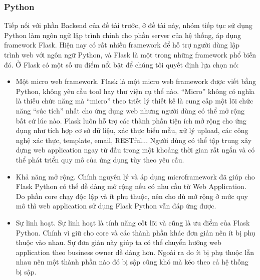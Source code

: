 \subsubsection{Python}
Tiếp nối với phần Backend của đề tài trước, ở đề tài này, nhóm tiếp tục sử dụng Python làm ngôn ngữ lập trình chính cho phần server của hệ thống, áp dụng framework Flask. Hiện nay có rất nhiều framework để hỗ trợ người dùng lập trình web với ngôn ngữ Python, và Flask là một trong những framework phổ biến đó. 
\newline
Ở Flask có một số ưu điểm nổi bật để chúng tôi quyết định lựa chọn nó:
\begin{itemize}
    \item Một micro web framework. Flask là một micro web framework được viết bằng Python, không yêu cầu tool hay thư viện cụ thể nào. “Micro” không có nghĩa là thiếu chức năng mà “micro” theo triết lý thiết kế là cung cấp một lõi chức năng “súc tích” nhất cho ứng dụng web nhưng người dùng có thể mở rộng bất cứ lúc nào. Flask luôn hỗ trợ các thành phần tiện ích mở rộng cho ứng dụng như tích hợp cơ sở dữ liệu, xác thực biểu mẫu, xử lý upload, các công nghệ xác thực, template, email, RESTful... Người dùng có thể tập trung xây dựng web application ngay từ đầu trong một khoảng thời gian rất ngắn và có thể phát triển quy mô của ứng dụng tùy theo yêu cầu.
    \item Khả năng mở rộng. Chính nguyên lý và áp dụng microframework đã giúp cho Flask Python có thể dễ dàng mở rộng nếu có nhu cầu từ Web Application. Do phần core chạy độc lập và ít phụ thuộc, nên cho dù mở rộng ở mức quy mô thì web application sử dụng Flask Python vẫn đáp ứng được.
    \item Sự linh hoạt. Sự linh hoạt là tính năng cốt lõi và cũng là ưu điểm của Flask Python. Chính vì giữ cho core và các thành phần khác đơn giản nên ít bị phụ thuộc vào nhau. Sự đơn giản này giúp ta có thể chuyển hướng web application theo business owner dễ dàng hơn. Ngoài ra do ít bị phụ thuộc lẫn nhau nên một thành phần nào đó bị sập cũng khó mà kéo theo cả hệ thống bị sập. 
\end{itemize}
